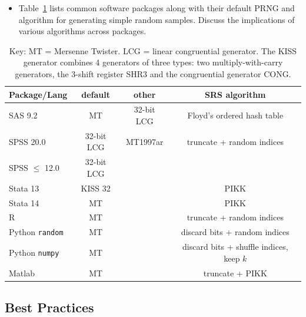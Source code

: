 \documentclass[12pt]{article}
\newcommand{\todo}[1]{{\color{red}{TO DO: \sc #1}}}
\begin{document}
\begin{itemize}
\item Table~\ref{tab:software} lists common software packages along with their default PRNG and algorithm for generating simple random samples. Discuss the implications of various algorithms across packages.
\end{itemize}


\begin{table}[h]
\caption{Key: MT = Mersenne Twister. LCG = linear congruential generator. The KISS generator combines 4 generators of three types: two multiply-with-carry generators, the 3-shift register SHR3 and the congruential generator CONG. }
\begin{center}
\begin{tabular}{l|c|c|c|}
Package/Lang & default & other & SRS algorithm \\
\hline
SAS 9.2 & MT & 32-bit LCG & Floyd's ordered hash table \\ %
SPSS 20.0 & 32-bit LCG & MT1997ar & truncate + random indices \\ %
SPSS $\leq$ 12.0 & 32-bit LCG & & \\
Stata 13 & KISS 32 & & PIKK \\
Stata 14 & MT & & PIKK \\
R & MT & & truncate + random indices \\
Python \texttt{random} & MT & & discard bits + random indices \\
Python \texttt{numpy} & MT & & discard bits + shuffle indices, keep $k$ \\
Matlab & MT & & truncate + PIKK
\end{tabular}
\end{center}
\label{tab:software}
\end{table}%



\subsection{Best Practices}

\todo{}
\end{document}
